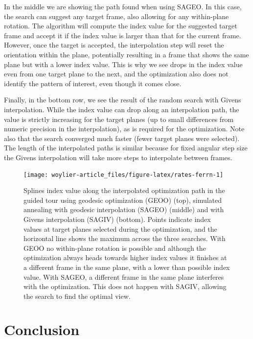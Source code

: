 In the middle we are showing the path found when using SAGEO. In this case, the search can suggest any target frame, also allowing for any within-plane rotation. The algorithm will compute the index value for the suggested target frame and accept it if the index value is larger than that for the current frame. However, once the target is accepted, the interpolation step will reset the orientation within the plane, potentially resulting in a frame that shows the same plane but with a lower index value. This is why we see drops in the index value even from one target plane to the next, and the optimization also does not identify the pattern of interest, even though it comes close.

Finally, in the bottom row, we see the result of the random search with Givens interpolation. While the index value can drop along an interpolation path, the value is strictly increasing for the target planes (up to small differences from numeric precision in the interpolation), as is required for the optimization. Note also that the search converged much faster (fewer target planes were selected). The length of the interpolated paths is similar because for fixed angular step size the Givens interpolation will take more steps to interpolate between frames.

\begin{figure}

{\centering \texttt{[image: woylier-article\_files/figure-latex/rates-ferrn-1]} 

}

\caption{Splines index value along the interpolated optimization path in the guided tour using geodesic optimization (GEOO) (top), simulated annealing with geodesic interpolation  (SAGEO) (middle) and with Givens interpolation (SAGIV) (bottom). Points indicate index values at target planes selected during the optimization, and the horizontal line shows the maximum across the three searches. With GEOO no within-plane rotation is possible and although the optimization always heads towards higher index values it finishes at a different frame in the same plane, with a lower than possible index value. With SAGEO, a different frame in the same plane interferes with the optimization. This does not happen with SAGIV, allowing the search to find the optimal view.}\label{fig:rates-ferrn}
\end{figure}

\hypertarget{conclusion}{%
\section{Conclusion}\label{conclusion}}

